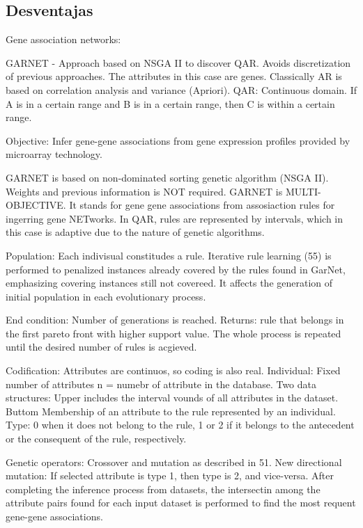 \documentclass[12pt,spanish]{article}
\begin{document}
\subsection{Desventajas}

Gene association networks:


GARNET - Approach based on NSGA II to discover QAR. Avoids discretization of previous approaches.
The attributes in this case are genes. Classically AR is based on correlation analysis and variance (Apriori).
QAR: Continuous domain. If A is in a certain range and B is in a certain range, then C is within a certain range.

Objective: Infer gene-gene associations from gene expression profiles provided by microarray technology.

GARNET is based on non-dominated sorting genetic algorithm (NSGA II). Weights and previous information is NOT required. GARNET is MULTI-OBJECTIVE. It stands for gene gene associations from assosiaction rules for ingerring gene NETworks. In QAR, rules are represented by intervals, which in this case is adaptive due to the nature of genetic algorithms.

Population: Each indivisual constitudes a rule. Iterative rule learning (55) is performed to penalized instances already covered by the rules found in GarNet, emphasizing covering instances still not covereed. It affects the generation of initial population in each evolutionary process.

End condition: Number of generations is reached. 
Returns: rule that belongs in the first pareto front with higher support value. The whole process is repeated until the desired number of rules is acgieved.

Codification: Attributes are continuos, so coding is also real. Individual: Fixed number of attributes n = numebr of attribute in the database. Two data structures: Upper includes the interval vounds of all attributes in the dataset.
Buttom Membership of an attribute to the rule represented by an individual.
Type:  0 when it does not belong to the rule, 1 or 2 if it belongs to the antecedent or the consequent of the rule, respectively. 

Genetic operators: Crossover and mutation as described in 51.
New directional mutation: If selected attribute is type 1, then type is 2, and vice-versa.
After completing the inference process from datasets, the intersectin among the attribute pairs found for each input dataset is performed to find the most requent gene-gene associations.
\end{document}
